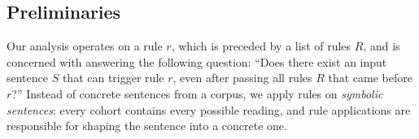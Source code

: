 




\subsection{Preliminaries}

Our analysis operates on a rule $r$, which is preceded by a list of rules $R$, and is concerned with answering the following question: ``Does there exist an input sentence $S$ that can trigger rule $r$, even after passing all rules $R$ that came before $r$?''
Instead of concrete sentences from a corpus, we apply rules on {\em symbolic sentences}:
every cohort contains every possible reading, and rule applications are responsible for shaping the sentence into a concrete one.

